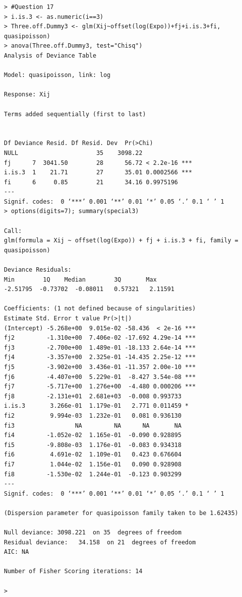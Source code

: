 \documentclass[11pt]{article}
\begin{document}
\begin{verbatim}
> #Question 17
> i.is.3 <- as.numeric(i==3)
> Three.off.Dummy3 <- glm(Xij~offset(log(Expo))+fj+i.is.3+fi, quasipoisson)
> anova(Three.off.Dummy3, test="Chisq")
Analysis of Deviance Table

Model: quasipoisson, link: log

Response: Xij

Terms added sequentially (first to last)


Df Deviance Resid. Df Resid. Dev  Pr(>Chi)    
NULL                      35    3098.22              
fj      7  3041.50        28      56.72 < 2.2e-16 ***
i.is.3  1    21.71        27      35.01 0.0002566 ***
fi      6     0.85        21      34.16 0.9975196    
---
Signif. codes:  0 ‘***’ 0.001 ‘**’ 0.01 ‘*’ 0.05 ‘.’ 0.1 ‘ ’ 1
> options(digits=7); summary(special3)

Call:
glm(formula = Xij ~ offset(log(Expo)) + fj + i.is.3 + fi, family = quasipoisson)

Deviance Residuals: 
Min        1Q    Median        3Q       Max  
-2.51795  -0.73702  -0.08011   0.57321   2.11591  

Coefficients: (1 not defined because of singularities)
Estimate Std. Error t value Pr(>|t|)    
(Intercept) -5.268e+00  9.015e-02 -58.436  < 2e-16 ***
fj2         -1.310e+00  7.406e-02 -17.692 4.29e-14 ***
fj3         -2.700e+00  1.489e-01 -18.133 2.64e-14 ***
fj4         -3.357e+00  2.325e-01 -14.435 2.25e-12 ***
fj5         -3.902e+00  3.436e-01 -11.357 2.00e-10 ***
fj6         -4.407e+00  5.229e-01  -8.427 3.54e-08 ***
fj7         -5.717e+00  1.276e+00  -4.480 0.000206 ***
fj8         -2.131e+01  2.681e+03  -0.008 0.993733    
i.is.3       3.266e-01  1.179e-01   2.771 0.011459 *  
fi2          9.994e-03  1.232e-01   0.081 0.936130    
fi3                 NA         NA      NA       NA    
fi4         -1.052e-02  1.165e-01  -0.090 0.928895    
fi5         -9.808e-03  1.176e-01  -0.083 0.934318    
fi6          4.691e-02  1.109e-01   0.423 0.676604    
fi7          1.044e-02  1.156e-01   0.090 0.928908    
fi8         -1.530e-02  1.244e-01  -0.123 0.903299    
---
Signif. codes:  0 ‘***’ 0.001 ‘**’ 0.01 ‘*’ 0.05 ‘.’ 0.1 ‘ ’ 1

(Dispersion parameter for quasipoisson family taken to be 1.62435)

Null deviance: 3098.221  on 35  degrees of freedom
Residual deviance:   34.158  on 21  degrees of freedom
AIC: NA

Number of Fisher Scoring iterations: 14

>
\end{verbatim}
\end{document}
